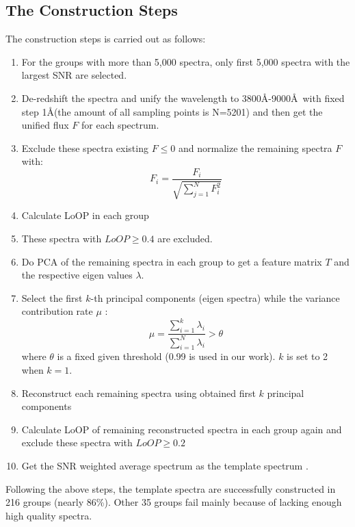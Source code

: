 \documentclass[referee]{raa}            %
\begin{document}
\subsection{The Construction Steps}
The construction steps is carried out as follows:
\begin{enumerate}
\item For the groups with more than 5,000 spectra, only first 5,000 spectra with the largest SNR are selected.
\item De-redshift the spectra and unify the wavelength to 3800\AA-9000\AA \ with fixed step 1\AA (the amount of all sampling points is N=5201) and then get the unified flux $F$ for each spectrum.
  \item Exclude these spectra existing $F\le0$ and normalize the remaining spectra $F$ with:
       \begin{equation}
        F_i=\frac{F_i}{\sqrt{\sum\limits_{j=1}^{N}F_i^2}}
       \end{equation}
 \item Calculate LoOP in each group
 \item These spectra with  $LoOP\ge0.4$ are excluded.
		

      \item Do PCA of the remaining spectra in each group to  get a feature matrix $T$ and the respective eigen values $\lambda$.
      \item Select the first $k$-th principal components (eigen spectra) while the variance contribution rate $\mu$ :
      \begin{equation}
       \mu=\frac{\sum\limits_{i=1}^{k}\lambda_i}{\sum\limits_{i=1}^{N}\lambda_i}>\theta
      \end{equation}
      where $\theta$ is a fixed given threshold  (0.99 is used in our work).
       $k$ is set to 2 when $k=1$.

     \item Reconstruct each remaining spectra using obtained first $k$ principal components
     \item Calculate LoOP of remaining reconstructed spectra in each group again and exclude these spectra with $LoOP\ge0.2$

      \item Get the SNR weighted average spectrum as the template spectrum .
     \end{enumerate}

Following the above steps, the template spectra are successfully constructed in 216 groups  (nearly 86\%).
Other 35 groups fail mainly because of lacking enough high quality spectra.
\end{document}

